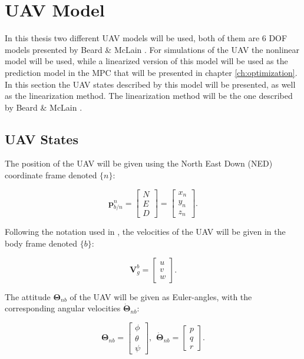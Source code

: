 \section{UAV Model}
\label{sec:model}

In this thesis two different UAV models will be used, both of them are 6 DOF models presented by Beard \& McLain \cite{uavBEARD}. For simulations of the UAV the nonlinear model will be used, while a linearized version of this model will be used as the prediction model in the MPC that will be presented in chapter \ref{ch:optimization}. In this section the UAV states described by this model will be presented, as well as the linearization method. The linearization method will be the one described by Beard \& McLain \cite{uavBEARD}.

\subsection{UAV States}

The position of the UAV will be given using the North East Down (NED) coordinate frame denoted $\{n\}$:

\begin{equation}
	\mathbf{p}_{b/n}^n =
	\begin{bmatrix}
		N \\ E \\ D
	\end{bmatrix}
	=
	\begin{bmatrix}
		x_n \\ y_n \\ z_n
	\end{bmatrix}.
\end{equation}

Following the notation used in \cite{uavBEARD}, the velocities of the UAV will be given in the body frame denoted $\{b\}$:

\begin{equation}
	\mathbf{V}^b_g =
	\begin{bmatrix}
		u \\ v \\ w
	\end{bmatrix}.
\end{equation}

The attitude $\bm{\Theta}_{nb}$ of the UAV will be given as Euler-angles, with the corresponding angular velocities $\bm{\dot{\Theta}}_{nb}$:

\begin{equation}
	\bm{\Theta}_{nb} =
	\begin{bmatrix}
		\phi \\ \theta \\ \psi
	\end{bmatrix},
	\hspace{5pt}
	\dot{\bm{\Theta}}_{nb} =
	\begin{bmatrix}
		p \\ q \\ r
	\end{bmatrix}.
\end{equation}



